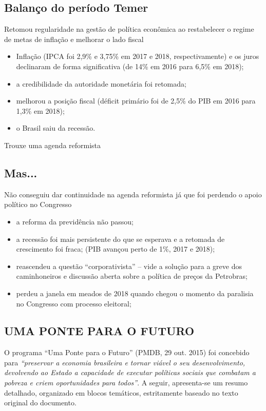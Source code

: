 \documentclass[a4paper,12pt]{article}[abntex2]
\begin{document}
\subsection{\textbf{Balanço do período Temer}}
Retomou regularidade na gestão de política econômica ao restabelecer o regime de metas de inflação e melhorar o lado fiscal
\begin{itemize}
    \item Inflação (IPCA foi 2,9\% e 3,75\% em 2017 e 2018, respectivamente) e os juros declinaram de forma significativa (de 14\% em 2016 para 6,5\% em 2018);
    \item a credibilidade da autoridade monetária foi retomada;
    \item melhorou a posição fiscal (déficit primário foi de 2,5\% do PIB em 2016 para 1,3\% em 2018);
    \item o Brasil saiu da recessão.
\end{itemize}

Trouxe uma agenda reformista

\subsection{\textbf{Mas...}}
Não conseguiu dar continuidade na agenda reformista já que foi perdendo o apoio político no Congresso
\begin{itemize}
    \item a reforma da previdência não passou;
    \item a recessão foi mais persistente do que se esperava e a retomada de crescimento foi fraca; (PIB avançou perto de 1\%, 2017 e 2018);
    \item reascendeu a questão “corporativista” – vide a solução para a greve dos caminhoneiros e discussão aberta sobre a política de preços da Petrobras;
    \item perdeu a janela em meados de 2018 quando chegou o momento da paralisia no Congresso com processo eleitoral;
\end{itemize}

\subsection{\textbf{UMA PONTE PARA O FUTURO}}

O programa “Uma Ponte para o Futuro” (PMDB, 29 out. 2015) foi concebido para \emph{“preservar a economia brasileira e tornar viável o seu desenvolvimento, devolvendo ao Estado a capacidade de executar políticas sociais que combatam a pobreza e criem oportunidades para todos”}.  
A seguir, apresenta-se um resumo detalhado, organizado em blocos temáticos, estritamente baseado no texto original do documento.
\end{document}
